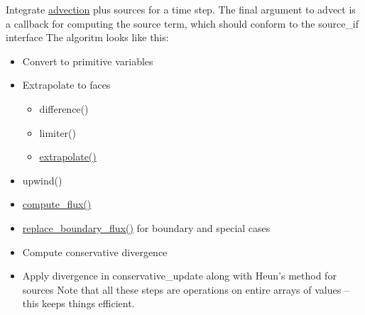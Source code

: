 Integrate \hyperlink{a00049}{advection} plus sources for a time step. The final argument to advect is a callback for computing the source term, which should conform to the source\_\-if interface The algoritm looks like this:\begin{itemize}
\item Convert to primitive variables\item Extrapolate to faces\begin{itemize}
\item difference()\item limiter()\item \hyperlink{a00049_36ba824cb5dc6ca6127866376d2e79ec}{extrapolate()}\end{itemize}
\item upwind()\item \hyperlink{a00049_3947a8a29b1c666b2d1b7223215e9873}{compute\_\-flux()}\item \hyperlink{a00049_ce0b27ec0ac171c15a919d07fb3b32c3}{replace\_\-boundary\_\-flux()} for boundary and special cases\item Compute conservative divergence\item Apply divergence in conservative\_\-update along with Heun's method for sources Note that all these steps are operations on entire arrays of values -- this keeps things efficient. \end{itemize}


